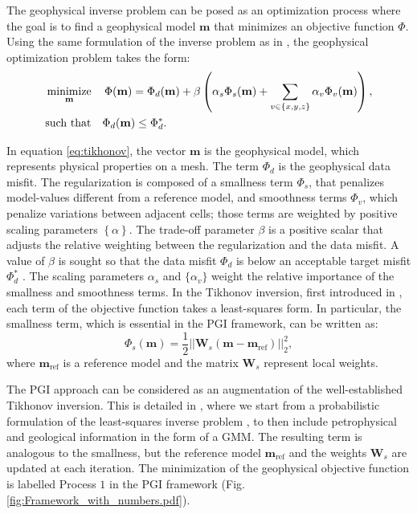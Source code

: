 \documentclass[extra, mreferee]{gji_joint} %
\begin{document}
The geophysical inverse problem can be posed as an optimization process where the goal is to find a geophysical model $\mathbf{m}$ that minimizes an objective function $\Phi$. Using the same formulation of the inverse problem as in \citet{Tutorial}, the geophysical optimization problem takes the form:
\begin{align}
\begin{split}
&\mathop{\hbox{minimize}}\limits_{\mathbf{m}}\quad\Phi(\mathbf{m}) = \Phi_d(\mathbf{m}) + \beta \left( \alpha_s \Phi_s(\mathbf{m}) + \sum_{v\in{\{x, y, z\}}} \alpha_{v} \Phi_{v}(\mathbf{m}) \right) \label{eq:tikhonov}, \\
&\text{such that}\quad \Phi_d(\mathbf{m}) \leq \Phi_d^*.
\end{split}
\end{align}

In equation \eqref{eq:tikhonov}, the vector $\mathbf{m}$ is the geophysical model, which represents physical properties on a mesh. The term $\Phi_d$ is the geophysical data misfit. The regularization is composed of a smallness term $\Phi_s$, that penalizes model-values different from a reference model, and smoothness terms $\Phi_v$, which penalize variations between adjacent cells; those terms are weighted by positive scaling parameters $\left\{\alpha\right\}$. The trade-off parameter $\beta$ is a positive scalar that adjusts the relative weighting between the regularization and the data misfit. A value of $\beta$ is sought so that the data misfit $\Phi_d$ is below an acceptable target misfit $\Phi_d^*$ \citep{Parker}. The scaling parameters $\alpha_s$ and $\{\alpha_{v}\}$ weight the relative importance of the smallness and smoothness terms. In the Tikhonov inversion, first introduced in \citet{tikhonov1977solutions}, each term of the objective function takes a least-squares form. In particular, the smallness term, which is essential in the PGI framework, can be written as:
\begin{equation}
\Phi_{s}(\mathbf{m})= \frac{1}{2}||\mathbf{W}_{s}(\mathbf{m}-\mathbf{m}_{\text{ref}})||^2_2 \label{regularizer},
\end{equation}
where $\mathbf{m}_{\text{ref}}$ is a reference model and the matrix $\mathbf{W}_s$ represent local weights.

The PGI approach can be considered as an augmentation of the well-established Tikhonov inversion. This is detailed in \citet{ggz389}, where we start from a probabilistic formulation of the least-squares inverse problem \citep{Tarantola}, to then include petrophysical and geological information in the form of a GMM. The resulting term is analogous to the smallness, but the reference model $\mathbf{m}_{\text{ref}}$ and the weights $\mathbf{W}_{s}$ are updated at each iteration. The minimization of the geophysical objective function is labelled Process $1$ in the PGI framework (Fig. \ref{fig:Framework_with_numbers.pdf}).
\end{document}
